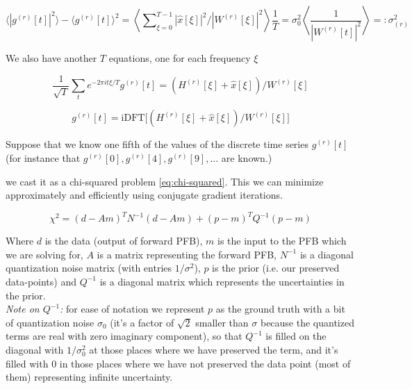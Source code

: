 \documentclass[12pt]{article}
\begin{document}
\begin{equation}\label{eq:sigma 0}
\langle |g^{(r)}[t]|^2 \rangle - \langle g^{(r)}[t]\rangle^2 = \left\langle \mathcal \sum_{\xi =0}^{T-1} |\hat x[\xi]|^2 / |W^{(r)}[\xi]|^2 \right\rangle \frac{1}{T} = \sigma_0^2\left\langle\frac{1}{|W^{(r)}[t]|^2}\right\rangle =: \sigma_{(r)}^2
\end{equation}

We also have another $T$ equations, one for each frequency $\xi$

\begin{equation}\label{eq:coupled equations}
\frac{1}{\sqrt T}\sum_t e^{-2\pi i t\xi/T}g^{(r)}[t] = (H^{(r)}[\xi] + \hat x[\xi]) / W^{(r)}[\xi]
\end{equation}

\begin{equation}\label{eq:}
g^{(r)}[t] = \text{iDFT}\big[(H^{(r)}[\xi] + \hat x[\xi]) / W^{(r)}[\xi]\big] 
\end{equation}

Suppose that we know one fifth of the values of the discrete time series $g^{(r)}[t]$ (for instance that $g^{(r)}[0], g^{(r)}[4], g^{(r)}[9],...$ are known.) 

we cast it as a chi-squared problem \eqref{eq:chi-squared}. This we can minimize approximately and efficiently using conjugate gradient iterations. 

\begin{equation}\label{eq:chi-squared}
    \chi^2 = (d - Am)^T N^{-1} (d - Am) + (p - m)^T Q^{-1} (p - m)
\end{equation}

Where $d$ is the data (output of forward PFB), $m$ is the input to the PFB which we are solving for, $A$ is a matrix representing the forward PFB, $N^{-1}$ is a diagonal quantization noise matrix (with entries $1/\sigma^2$), $p$ is the prior (i.e. our preserved data-points) and $Q^{-1}$ is a diagonal matrix which represents the uncertainties in the prior.\\

\textit{Note on $Q^{-1}$:} for ease of notation we represent $p$ as the ground truth with a bit of quantization noise $\sigma_0$ (it's a factor of $\sqrt{2}$ smaller than $\sigma$ because the quantized terms are real with zero imaginary component), so that $Q^{-1}$ is filled on the diagonal with $1/\sigma_0^2$ at those places where we have preserved the term, and it's filled with $0$ in those places where we have not preserved the data point (most of them) representing infinite uncertainty. \\ 
\end{document}
